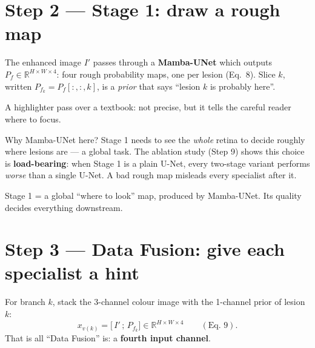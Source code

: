 \documentclass[11pt,a4paper]{article}
\begin{document}
\section{Step 2 --- Stage 1: draw a rough map}
\begin{idea}
The enhanced image $I'$ passes through a \textbf{Mamba-UNet} which outputs
$P_f \in \mathbb{R}^{H\times W\times 4}$: four rough probability maps, one per lesion (Eq.~8).
Slice $k$, written $P_{f_k}=P_f[:,:,k]$, is a \emph{prior} that says ``lesion $k$ is probably here''.
\end{idea}

\begin{analogy}
A highlighter pass over a textbook: not precise, but it tells the careful reader where to focus.
\end{analogy}

Why Mamba-UNet here? Stage 1 needs to see the \emph{whole} retina to decide roughly where lesions
are --- a global task. The ablation study (Step 9) shows this choice is \textbf{load-bearing}: when
Stage 1 is a plain U-Net, every two-stage variant performs \emph{worse} than a single U-Net. A bad
rough map misleads every specialist after it.

\begin{recap}
Stage 1 = a global ``where to look'' map, produced by Mamba-UNet. Its quality decides
everything downstream.
\end{recap}

\section{Step 3 --- Data Fusion: give each specialist a hint}
\begin{idea}
For branch $k$, stack the 3-channel colour image with the 1-channel prior of lesion $k$:
\[
x_{v(k)} = \big[\, I' \,;\, P_{f_k} \big] \in \mathbb{R}^{H\times W\times 4}\qquad(\text{Eq.~9}).
\]
That is all ``Data Fusion'' is: a \textbf{fourth input channel}.
\end{idea}

\begin{center}
\end{center}
\end{document}
